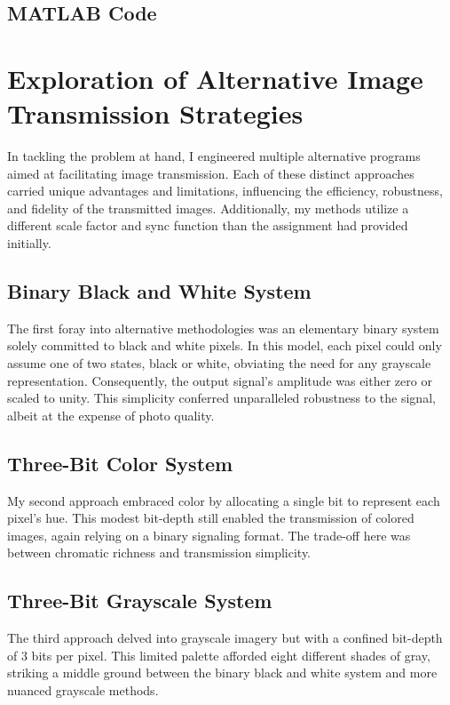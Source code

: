 \documentclass{article}
\begin{document}
\subsection*{MATLAB Code}

\newpage
\section*{Exploration of Alternative Image Transmission Strategies}

In tackling the problem at hand, I engineered multiple alternative programs aimed at facilitating image transmission. Each of these distinct approaches carried unique advantages and limitations, influencing the efficiency, robustness, and fidelity of the transmitted images.
Additionally, my methods utilize a different scale factor and sync function than the assignment had provided initially. 

\subsection*{Binary Black and White System}

The first foray into alternative methodologies was an elementary binary system solely committed to black and white pixels. In this model, each pixel could only assume one of two states, black or white, obviating the need for any grayscale representation. Consequently, the output signal's amplitude was either zero or scaled to unity. This simplicity conferred unparalleled robustness to the signal, albeit at the expense of photo quality.

\subsection*{Three-Bit Color System}

My second approach embraced color by allocating a single bit to represent each pixel's hue. This modest bit-depth still enabled the transmission of colored images, again relying on a binary signaling format. The trade-off here was between chromatic richness and transmission simplicity.

\subsection*{Three-Bit Grayscale System}

The third approach delved into grayscale imagery but with a confined bit-depth of 3 bits per pixel. This limited palette afforded eight different shades of gray, striking a middle ground between the binary black and white system and more nuanced grayscale methods.
\end{document}
